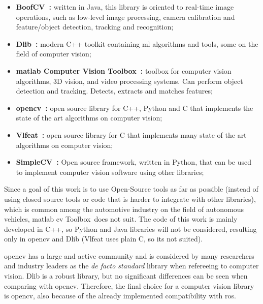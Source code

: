 \begin{itemize}
	\item \textbf{BoofCV~\cite{boofcv}:} written in Java, this library is oriented to real-time image operations, such as low-level image processing, camera calibration and feature/object  detection, tracking and recognition;
	\item \textbf{Dlib~\cite{dlib}:} modern C++ toolkit containing \acl{ml} algorithms and tools, some on the field of computer vision;
	\item \textbf{\ac{matlab} Computer Vision Toolbox\texttrademark~\cite{matlabcvtoolbox}:} toolbox for computer vision algorithms, 3D vision, and video processing systems. Can perform object detection and tracking. Detects, extracts and matches features;
	\item \textbf{\acf{opencv}~\cite{opencv}:} open source library for C++, Python and C that implements the state of the art algorithms on computer vision;
	\item \textbf{Vlfeat~\cite{vlfeat}:} open source library for C that implements many state of the art algorithms on computer vision;
	\item \textbf{SimpleCV~\cite{simplecv}:} Open source framework, written in Python, that can be used to implement computer vision software using other libraries;
\end{itemize}

Since a goal of this work is to use Open-Source tools as far as possible (instead of using closed source tools or code that is harder to integrate with other libraries), which is common among the automotive industry on the field of autonomous vehicles, \ac{matlab} \acl{cv} Toolbox\texttrademark~does not suit. The code of this work is mainly developed in C++, so Python and Java libraries will not be considered, resulting only in \ac{opencv} and Dlib (Vlfeat uses plain C, so its not suited). 

\ac{opencv} has a large and active community and is considered by many researchers and industry leaders as the \textit{de facto standard} library when refereeing to computer vision. Dlib is a robust library, but no significant differences can be seen when comparing with \ac{opencv}. Therefore, the final choice for a computer vision library is \ac{opencv}, also because of the already implemented compatibility with \ac{ros}.





